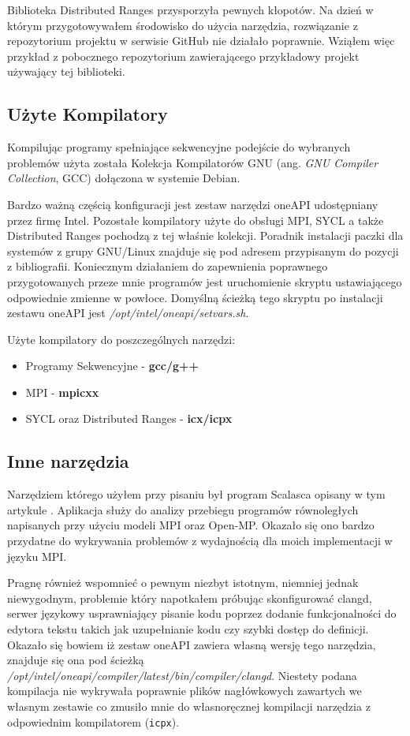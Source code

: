 \documentclass[a4paper,12pt]{book} %
\begin{document}
Biblioteka Distributed Ranges przysporzyła pewnych kłopotów. Na dzień w którym przygotowywałem środowisko do użycia narzędzia, rozwiązanie z repozytorium projektu w serwisie GitHub nie działało poprawnie. Wziąłem więc przykład z pobocznego repozytorium zawierającego przykładowy projekt używający tej biblioteki. \cite{dist-ranges-tutorial}
\subsection{Użyte Kompilatory}
Kompilując programy spełniające sekwencyjne podejście do wybranych problemów użyta została Kolekcja Kompilatorów GNU (ang. \emph{GNU Compiler Collection}, GCC) dołączona w systemie Debian.

Bardzo ważną częścią konfiguracji jest zestaw narzędzi oneAPI udostępniany przez firmę Intel. Pozostałe kompilatory użyte do obsługi MPI, SYCL a także Distributed Ranges pochodzą z tej właśnie kolekcji. Poradnik instalacji paczki dla systemów z grupy GNU/Linux znajduje się pod adresem przypisanym do pozycji \cite{oneapi-install} z bibliografii. Koniecznym działaniem do zapewnienia poprawnego przygotowanych przeze mnie programów jest uruchomienie skryptu ustawiającego odpowiednie zmienne w powłoce. Domyślną ścieżką tego skryptu po instalacji zestawu oneAPI jest \emph{/opt/intel/oneapi/setvars.sh}.

Użyte kompilatory do poszczególnych narzędzi:
\begin{itemize}
\item Programy Sekwencyjne - \textbf{gcc/g++}
\item MPI - \textbf{mpicxx}
\item SYCL oraz Distributed Ranges - \textbf{icx/icpx}
\end{itemize}

\subsection{Inne narzędzia}
Narzędziem którego użyłem przy pisaniu był program Scalasca opisany w tym artykule \cite{scalasca}. Aplikacja służy do analizy przebiegu programów równoległych napisanych przy użyciu modeli MPI oraz Open-MP. Okazało się ono bardzo przydatne do wykrywania problemów z wydajnością dla moich implementacji w języku MPI.

Pragnę również wspomnieć o pewnym niezbyt istotnym, niemniej jednak niewygodnym, problemie który napotkałem próbując skonfigurować clangd, serwer językowy usprawniający pisanie kodu poprzez dodanie funkcjonalności do edytora tekstu takich jak uzupełnianie kodu czy szybki dostęp do definicji. Okazało się bowiem iż zestaw oneAPI zawiera własną wersję tego narzędzia, znajduje się ona pod ścieżką \emph{/opt/intel/oneapi/compiler/latest/bin/compiler/clangd}. Niestety podana kompilacja nie wykrywała poprawnie plików nagłówkowych zawartych we własnym zestawie co zmusiło mnie do własnoręcznej kompilacji narzędzia z odpowiednim kompilatorem (\texttt{icpx}).
\end{document}
